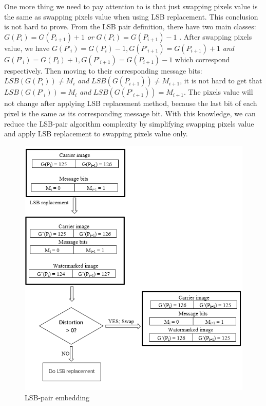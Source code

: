 One more thing we need to pay attention to is that just swapping pixels value is the same as swapping pixels value when using LSB replacement. This conclusion is not hard to prove. From the LSB pair definition, there have two main classes:  \(G(P_{i}) = G(P_{i+1}) + 1\) \textit{or}  \(G(P_{i}) = G(P_{i+1}) - 1\) . After swapping pixels value, we have  \(G(P’_{i}) = G(P_{i}) - 1, G(P’_{i+1}) = G(P_{i+1}) + 1\) \textit{and}  \(G(P’_{i}) = G(P_{i}) + 1, G(P’_{i+1}) = G(P_{i+1}) - 1\) which correspond respectively. Then moving to their corresponding message bits: \(LSB(G(P_{i})) \neq M_{i}\) \textit{and} \(LSB(G(P_{i+1})) \neq M_{i+1}\), it is not hard to get that \(LSB(G(P’_{i})) = M_{i}\) \textit{and} \(LSB(G(P’_{i+1})) = M_{i+1}\). The pixels value will not change after applying LSB replacement method, because the last bit of each pixel is the same as its corresponding message bit. With this knowledge, we can reduce the LSB-pair algorithm complexity by simplifying swapping pixels value and apply LSB replacement to swapping pixels value only. 


\begin{figure}[h]
\includegraphics[width=\columnwidth]{image/LSB-pair_example.PNG}
\caption{LSB-pair embedding}
\label{fig:figure}
\end{figure}



